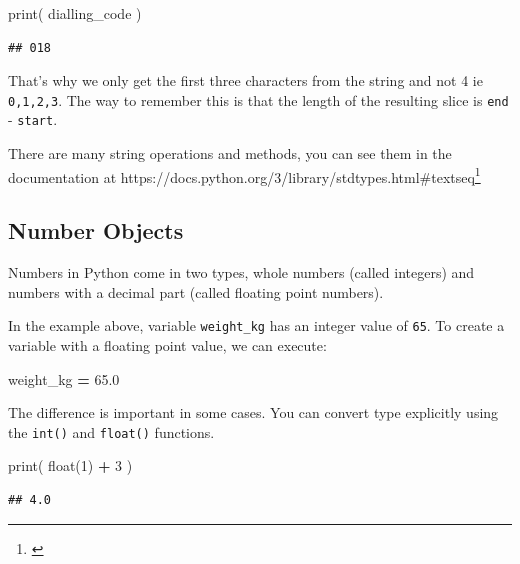 \documentclass[]{book}
\newenvironment{Shaded}{\begin{snugshade}}{\end{snugshade}}
\newcommand{\BuiltInTok}[1]{#1}
\newcommand{\DecValTok}[1]{\textcolor[rgb]{0.00,0.00,0.81}{#1}}
\newcommand{\FloatTok}[1]{\textcolor[rgb]{0.00,0.00,0.81}{#1}}
\newcommand{\NormalTok}[1]{#1}
\newcommand{\OperatorTok}[1]{\textcolor[rgb]{0.81,0.36,0.00}{\textbf{#1}}}
\let\rmarkdownfootnote\footnote%
\def\footnote{\protect\rmarkdownfootnote}
\renewcommand{\href}[2]{#2\footnote{\url{#1}}}
\theoremstyle{definition}
\theoremstyle{definition}
\theoremstyle{definition}
\theoremstyle{remark}
\begin{document}
\begin{Shaded}
\begin{Highlighting}[]
\BuiltInTok{print}\NormalTok{( dialling_code )}
\end{Highlighting}
\end{Shaded}

\begin{verbatim}
## 018
\end{verbatim}

That's why we only get the first three characters from the string and
not 4 ie \texttt{0,1,2,3}. The way to remember this is that the length
of the resulting slice is \texttt{end} - \texttt{start}.

There are many string operations and methods, you can see them in the
documentation at
\href{}{https://docs.python.org/3/library/stdtypes.html\#textseq}

\hypertarget{number-objects}{%
\subsection{Number Objects}\label{number-objects}}

Numbers in Python come in two types, whole numbers (called integers) and
numbers with a decimal part (called floating point numbers).

In the example above, variable \texttt{weight\_kg} has an integer value
of \texttt{65}. To create a variable with a floating point value, we can
execute:

\begin{Shaded}
\begin{Highlighting}[]
\NormalTok{weight_kg }\OperatorTok{=} \FloatTok{65.0}
\end{Highlighting}
\end{Shaded}

The difference is important in some cases. You can convert type
explicitly using the \texttt{int()} and \texttt{float()} functions.

\begin{Shaded}
\begin{Highlighting}[]
\BuiltInTok{print}\NormalTok{( }\BuiltInTok{float}\NormalTok{(}\DecValTok{1}\NormalTok{) }\OperatorTok{+} \DecValTok{3}\NormalTok{ )}
\end{Highlighting}
\end{Shaded}

\begin{verbatim}
## 4.0
\end{verbatim}
\end{document}
